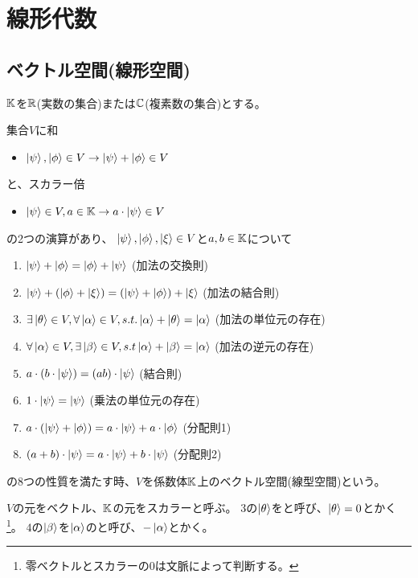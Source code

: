 \section{線形代数}
\subsection{ベクトル空間(線形空間)}
$\mathbb{K}$を$\mathbb{R}$(実数の集合)または$\mathbb{C}$(複素数の集合)とする。

集合$V$に和
\begin{itemize}
  \item $\ket{\psi},\ket{\phi} \in V \to \ket{\psi} + \ket{\phi} \in V$
\end{itemize}
と、スカラー倍
\begin{itemize}
  \item $\ket{\psi} \in V, a \in \mathbb{K} \to a\cdot \ket{\psi} \in V$
\end{itemize}
の2つの演算があり、
$\ket{\psi},\ket{\phi},\ket{\xi} \in V$と$a,b \in \mathbb{K}$について
\begin{enumerate}
  \item $\ket{\psi} + \ket{\phi} = \ket{\phi} + \ket{\psi}$ (加法の交換則)
  \item $\ket{\psi} + (\ket{\phi} + \ket{\xi}) = (\ket{\psi} + \ket{\phi}) + \ket{\xi}$ (加法の結合則)
  \item $\exists \ket{\theta} \in V, \forall \ket{\alpha} \in V, s.t. \ket{\alpha} + \ket{\theta} = \ket{\alpha}$ (加法の単位元の存在)
  \item $\forall \ket{\alpha} \in V, \exists \ket{\beta} \in V, s.t \ket{\alpha} + \ket{\beta} = \ket{\alpha}$ (加法の逆元の存在)
  \item $a\cdot(b \cdot \ket{\psi}) = (ab) \cdot \ket{\psi}$ (結合則)
  \item $1 \cdot \ket{\psi} = \ket{\psi}$ (乗法の単位元の存在)
  \item $a \cdot (\ket{\psi} + \ket{\phi}) = a \cdot \ket{\psi} + a \cdot \ket{\phi}$ (分配則1)
  \item $(a+b) \cdot \ket{\psi} = a \cdot \ket{\psi} + b \cdot \ket{\psi}$ (分配則2)
\end{enumerate}
の8つの性質を満たす時、$V$を係数体$\mathbb{K}$上のベクトル空間(線型空間)という。

$V$の元をベクトル、$\mathbb{K}$の元をスカラーと呼ぶ。
$3$の$\ket{\theta}$をと呼び、$\ket{\theta} = 0$とかく\footnote{零ベクトルとスカラーの$0$は文脈によって判断する。}。
$4$の$\ket{\beta}$を$\ket{\alpha}$のと呼び、$-\ket{\alpha}$とかく。

